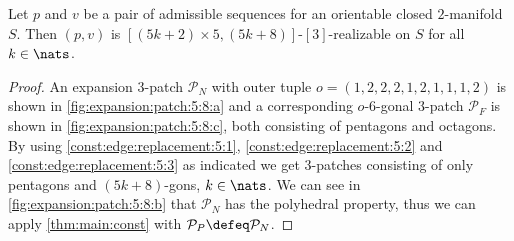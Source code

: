 \clearpage
\begin{theorem}
  Let $p$ and $v$ be a pair of admissible sequences for an orientable closed $2$-manifold $S$. Then $(p, v)$ is $[(5k + 2) \times 5, (5k+8)]$-$[3]$-realizable on $S$ for all $k \in \nats$.
  \begin{proof}
    An expansion $3$-patch $\mathcal{P}_N$ with outer tuple $o = (1, 2, 2, 2, 1, 2, 1, 1, 1, 2)$ is shown in \autoref{fig:expansion:patch:5:8:a} and a corresponding $o$-$6$-gonal $3$-patch $\mathcal{P}_F$ is shown in \autoref{fig:expansion:patch:5:8:c}, both consisting of pentagons and octagons. By using \autoref{const:edge:replacement:5:1}, \autoref{const:edge:replacement:5:2} and \autoref{const:edge:replacement:5:3} as indicated we get $3$-patches consisting of only pentagons and $(5k+8)$-gons, $k \in \nats$. We can see in \autoref{fig:expansion:patch:5:8:b} that $\mathcal{P}_N$ has the polyhedral property, thus we can apply \autoref{thm:main:const} with $\mathcal{P}_P \defeq \mathcal{P}_N$.
  \end{proof}
\end{theorem}%
